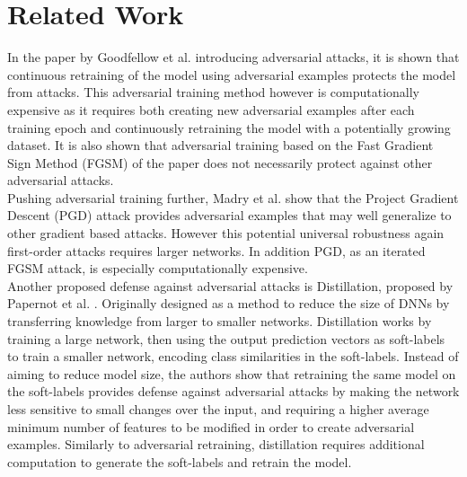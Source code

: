 \documentclass[12pt,oneside]{CUNY_PhD}
\begin{document}
\section{Related Work}
In the paper by Goodfellow et al.\cite{goodfellow2015explaining} introducing adversarial attacks, it is shown that continuous retraining of the model using adversarial examples protects the model from attacks. This adversarial training method however is computationally expensive as it requires both creating new adversarial examples after each training epoch and continuously retraining the model with a potentially growing dataset. It is also shown that adversarial training based on the Fast Gradient Sign Method (FGSM) of the paper does not necessarily protect against other adversarial attacks.\\
Pushing adversarial training further, Madry et al.\cite{madry2019deep} show that the Project Gradient Descent (PGD) attack provides adversarial examples that may well generalize to other gradient based attacks. However this potential universal robustness again first-order attacks requires larger networks. In addition PGD, as an iterated FGSM attack, is especially computationally expensive.\\
Another proposed defense against adversarial attacks is Distillation, proposed by Papernot et al. \cite{Papernot2016DistillationAA}. Originally designed as a method to reduce the size of DNNs by transferring knowledge from larger to smaller networks. Distillation works by training a large network, then using the output prediction vectors as soft-labels to train a smaller network, encoding class similarities in the soft-labels. Instead of aiming to reduce model size, the authors show that retraining the same model on the soft-labels provides defense against adversarial attacks by making the network less sensitive to small changes over the input, and requiring a higher average minimum
number of features to be modified in order to create adversarial examples. Similarly to adversarial retraining, distillation requires additional computation to generate the soft-labels and retrain the model.\\
\end{document}
